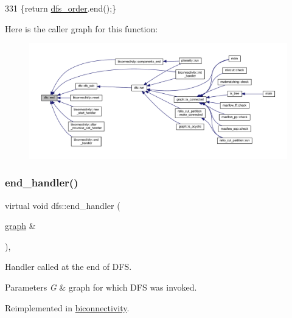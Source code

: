 \begin{DoxyCode}
331     \{\textcolor{keywordflow}{return} \mbox{\hyperlink{classdfs_af70a73ace68afd91ef944f984c9f28d5}{dfs\_order}}.end();\}
\end{DoxyCode}
Here is the caller graph for this function\+:
\nopagebreak
\begin{figure}[H]
\begin{center}
\leavevmode
\includegraphics[width=350pt]{classdfs_af847633fa642258d3522e8deb26aef37_icgraph}
\end{center}
\end{figure}
\mbox{\label{classdfs_a59c512fa99ad3809db3e24347ab43b85}} 
\subsubsection{\texorpdfstring{end\+\_\+handler()}{end\_handler()}}
{\footnotesize\ttfamily virtual void dfs\+::end\+\_\+handler (\begin{DoxyParamCaption}\item[{\mbox{\hyperlink{classgraph}{graph}} \&}]{ }\end{DoxyParamCaption})\hspace{0.3cm}{\ttfamily [inline]}, {\ttfamily [virtual]}}



Handler called at the end of D\+FS. 


\begin{DoxyParams}{Parameters}
{\em G} & graph for which D\+FS was invoked. \\
\hline
\end{DoxyParams}


Reimplemented in \mbox{\hyperlink{classbiconnectivity_a2583331a4561f3db221ab674d2e5d75e}{biconnectivity}}.



